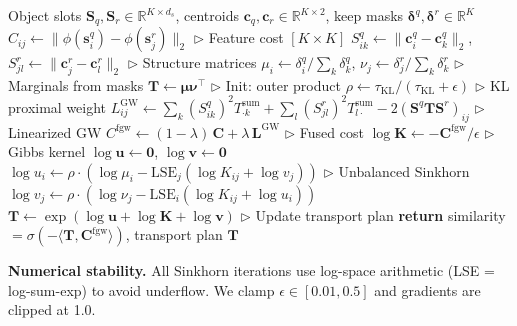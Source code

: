 \documentclass{article}
\newcommand{\R}{\mathbb{R}}
\begin{document}
\begin{algorithm}[t]
\caption{UFGW Matching (forward pass)}
\label{alg:ufgw}
\begin{algorithmic}[1]
\REQUIRE Object slots $\mathbf{S}_q, \mathbf{S}_r \in \R^{K \times d_s}$, centroids $\mathbf{c}_q, \mathbf{c}_r \in \R^{K \times 2}$, keep masks $\boldsymbol{\delta}^q, \boldsymbol{\delta}^r \in \R^K$
\STATE $C_{ij} \leftarrow \|\phi(\mathbf{s}_i^q) - \phi(\mathbf{s}_j^r)\|_2$ \hfill $\triangleright$ Feature cost $[K{\times}K]$
\STATE $S^q_{ik} \leftarrow \|\mathbf{c}_i^q - \mathbf{c}_k^q\|_2$, $S^r_{jl} \leftarrow \|\mathbf{c}_j^r - \mathbf{c}_l^r\|_2$ \hfill $\triangleright$ Structure matrices
\STATE $\mu_i \leftarrow \delta_i^q / \sum_k \delta_k^q$, $\nu_j \leftarrow \delta_j^r / \sum_k \delta_k^r$ \hfill $\triangleright$ Marginals from masks
\STATE $\mathbf{T} \leftarrow \boldsymbol{\mu} \boldsymbol{\nu}^\top$ \hfill $\triangleright$ Init: outer product
\STATE $\rho \leftarrow \tau_{\text{KL}} / (\tau_{\text{KL}} + \epsilon)$ \hfill $\triangleright$ KL proximal weight
    \STATE $L^{\text{GW}}_{ij} \leftarrow \sum_k (S^q_{ik})^2 T_{\cdot k}^{\text{sum}} + \sum_l (S^r_{jl})^2 T_{l\cdot}^{\text{sum}} - 2 (\mathbf{S}^q \mathbf{T} \mathbf{S}^r)_{ij}$ \hfill $\triangleright$ Linearized GW
    \STATE $C^{\text{fgw}} \leftarrow (1{-}\lambda)\, \mathbf{C} + \lambda\, \mathbf{L}^{\text{GW}}$ \hfill $\triangleright$ Fused cost
    \STATE $\log \mathbf{K} \leftarrow -\mathbf{C}^{\text{fgw}} / \epsilon$ \hfill $\triangleright$ Gibbs kernel
    \STATE $\log \mathbf{u} \leftarrow \mathbf{0}$, $\log \mathbf{v} \leftarrow \mathbf{0}$
        \STATE $\log u_i \leftarrow \rho \cdot (\log \mu_i - \text{LSE}_j(\log K_{ij} + \log v_j))$ \hfill $\triangleright$ Unbalanced Sinkhorn
        \STATE $\log v_j \leftarrow \rho \cdot (\log \nu_j - \text{LSE}_i(\log K_{ij} + \log u_i))$
    \ENDFOR
    \STATE $\mathbf{T} \leftarrow \exp(\log \mathbf{u} + \log \mathbf{K} + \log \mathbf{v})$ \hfill $\triangleright$ Update transport plan
\ENDFOR
\STATE \textbf{return} similarity $= \sigma(-\langle \mathbf{T}, \mathbf{C}^{\text{fgw}} \rangle)$, transport plan $\mathbf{T}$
\end{algorithmic}
\end{algorithm}

\textbf{Numerical stability.} All Sinkhorn iterations use log-space arithmetic (LSE = log-sum-exp) to avoid underflow. We clamp $\epsilon \in [0.01, 0.5]$ and gradients are clipped at 1.0.
\end{document}

